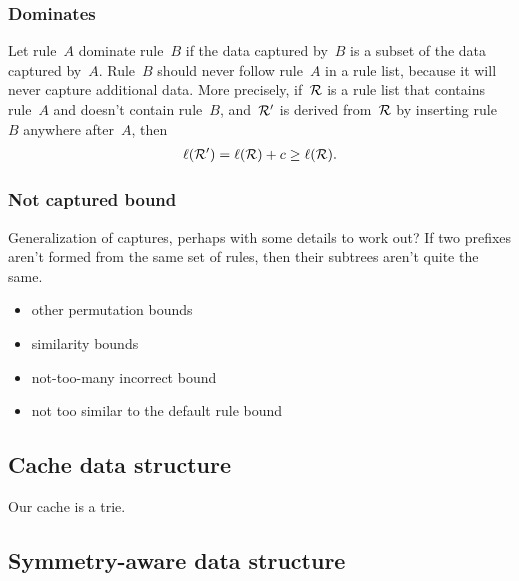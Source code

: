 \subsubsection{Dominates}

Let rule~$A$ dominate rule~$B$ if the data captured by~$B$ is a subset of the data captured by~$A$.
%
Rule~$B$ should never follow rule~$A$ in a rule list, because it will never capture additional data.
%
More precisely, if~${\mathcal R}$ is a rule list that contains rule~$A$ and doesn't contain rule~$B$,
and~${\mathcal R}'$ is derived from~${\mathcal R}$ by inserting rule~$B$ anywhere after~$A$, then
\begin{align}
\ell(\RL') = \ell(\RL) + c \ge \ell(\RL).
\end{align}
%

\subsubsection{Not captured bound}

Generalization of captures, perhaps with some details to work out?
If two prefixes aren't formed from the same set of rules, then their subtrees aren't quite the same.

\begin{itemize}
\item other permutation bounds
\item similarity bounds
\item not-too-many incorrect bound
\item not too similar to the default rule bound
\end{itemize}

\subsection{Cache data structure}
\label{sec:cache}

Our cache is a trie.

\subsection{Symmetry-aware data structure}

